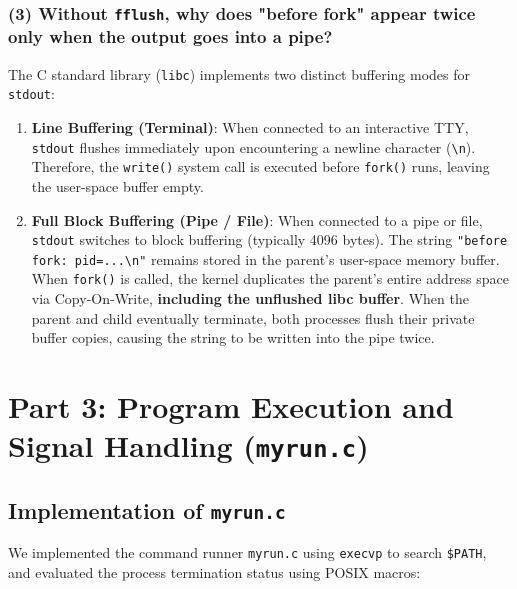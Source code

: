\documentclass[12pt,a4paper]{article}
\begin{document}
\subsubsection*{(3) Without \texttt{fflush}, why does "before fork" appear twice only when the output goes into a pipe?}
The C standard library (\texttt{libc}) implements two distinct buffering modes for \texttt{stdout}:
\begin{enumerate}
    \item \textbf{Line Buffering (Terminal)}: When connected to an interactive TTY, \texttt{stdout} flushes immediately upon encountering a newline character (\texttt{\textbackslash n}). Therefore, the \texttt{write()} system call is executed before \texttt{fork()} runs, leaving the user-space buffer empty.
    \item \textbf{Full Block Buffering (Pipe / File)}: When connected to a pipe or file, \texttt{stdout} switches to block buffering (typically 4096 bytes). The string \texttt{"before fork: pid=...\textbackslash n"} remains stored in the parent's user-space memory buffer. When \texttt{fork()} is called, the kernel duplicates the parent's entire address space via Copy-On-Write, \textbf{including the unflushed libc buffer}. When the parent and child eventually terminate, both processes flush their private buffer copies, causing the string to be written into the pipe twice.
\end{enumerate}

\newpage

\section{Part 3: Program Execution and Signal Handling (\texttt{myrun.c})}

\subsection{Implementation of \texttt{myrun.c}}
We implemented the command runner \texttt{myrun.c} using \texttt{execvp} to search \texttt{\$PATH}, and evaluated the process termination status using POSIX macros:
\end{document}
